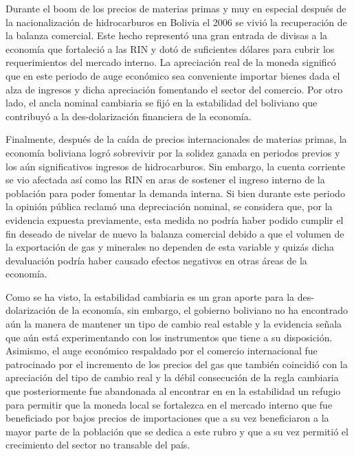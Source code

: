 \documentclass[12pt,letterpaper]{article}
\begin{document}
Durante el boom de los precios de materias primas y muy en especial después de la nacionalización de hidrocarburos en Bolivia el 2006 se vivió la recuperación de la balanza comercial. Este hecho representó una gran entrada de divisas a la economía que fortaleció a las RIN y dotó de suficientes dólares para cubrir los requerimientos del mercado interno. La apreciación real de la moneda significó que en este periodo de auge económico sea conveniente importar bienes dada el alza de ingresos y dicha apreciación fomentando el sector del comercio. Por otro lado, el ancla nominal cambiaria se fijó en la estabilidad del boliviano que contribuyó a la des-dolarización financiera de la economía.

Finalmente, después de la caída de precios internacionales de materias primas, la economía boliviana logró sobrevivir por la solidez ganada en periodos previos y los aún significativos ingresos de hidrocarburos. Sin embargo, la cuenta corriente se vio afectada así como las RIN en aras de sostener el ingreso interno de la población para poder fomentar la demanda interna. Si bien durante este periodo la opinión pública reclamó una depreciación nominal, se considera que, por la evidencia expuesta previamente, esta medida no podría haber podido cumplir el fin deseado de nivelar de nuevo la balanza comercial debido a que el volumen de la exportación de gas y minerales no dependen de esta variable y quizás dicha devaluación podría haber causado efectos negativos en otras áreas de la economía.

Como se ha visto, la estabilidad cambiaria es un gran aporte para la des-dolarización de la economía, sin embargo, el gobierno boliviano no ha encontrado aún la manera de mantener un tipo de cambio real estable y la evidencia señala que aún está experimentando con los instrumentos que tiene a su disposición. Asimismo, el auge económico respaldado por el comercio internacional fue patrocinado por el incremento de los precios del gas que también coincidió con la apreciación del tipo de cambio real y la débil consecución de la regla cambiaria que posteriormente fue abandonada al encontrar en en la estabilidad un refugio para permitir que la moneda local se fortalezca en el mercado interno que fue beneficiado por bajos precios de importaciones que a su vez beneficiaron a la mayor parte de la población que se dedica a este rubro y que a su vez permitió el crecimiento del sector no transable del país.

\end{document}
